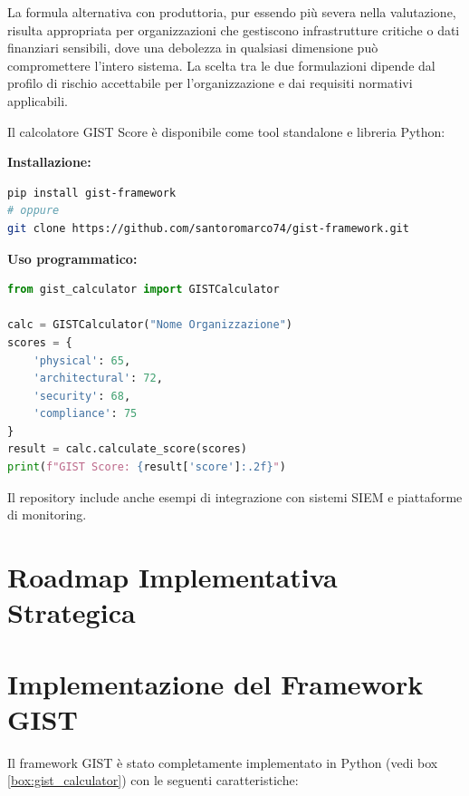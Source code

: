 La formula alternativa con produttoria, pur essendo più severa nella valutazione, risulta appropriata per organizzazioni che gestiscono infrastrutture critiche o dati finanziari sensibili, dove una debolezza in qualsiasi dimensione può compromettere l'intero sistema. La scelta tra le due formulazioni dipende dal profilo di rischio accettabile per l'organizzazione e dai requisiti normativi applicabili.


\begin{tcolorbox}[colback=red!5!white,colframe=red!75!black,title=GIST Calculator - Implementazione Completa]
Il calcolatore GIST Score è disponibile come tool standalone e libreria Python:

\textbf{Installazione:}
\begin{lstlisting}[language=bash, basicstyle=\footnotesize\ttfamily]
pip install gist-framework
# oppure
git clone https://github.com/santoromarco74/gist-framework.git
\end{lstlisting}

\textbf{Uso programmatico:}
\begin{lstlisting}[language=python, basicstyle=\footnotesize\ttfamily]
from gist_calculator import GISTCalculator

calc = GISTCalculator("Nome Organizzazione")
scores = {
    'physical': 65,
    'architectural': 72,
    'security': 68,
    'compliance': 75
}
result = calc.calculate_score(scores)
print(f"GIST Score: {result['score']:.2f}")
\end{lstlisting}

Il repository include anche esempi di integrazione con sistemi SIEM e piattaforme di monitoring.
\label{box:gist_calculator}
\end{tcolorbox}

\section{\texorpdfstring{Roadmap Implementativa Strategica}{5.4 - Roadmap Implementativa Strategica}}
\label{sec:5.4}

\section{\texorpdfstring{Implementazione del Framework GIST}{5.4 - Implementazione del Framework GIST}}
\label{sec:gist_implementation}

Il framework GIST è stato completamente implementato in Python 
(vedi box \ref {box:gist_calculator}) con le seguenti caratteristiche:

